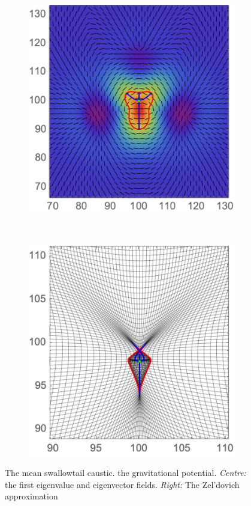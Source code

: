 \documentclass[a4paper, 11pt]{article}
\begin{document}
\begin{figure}
\begin{subfigure}[b]{0.32\textwidth}
\includegraphics[width=\textwidth]{Swallowtail_mean_L}
\end{subfigure}~
\begin{subfigure}[b]{0.32\textwidth}
\includegraphics[width=\textwidth]{Swallowtail_mean_Z}
\end{subfigure}
\caption{The mean swallowtail caustic.  the gravitational potential. \textit{Centre:} the first eigenvalue and eigenvector fields. \textit{Right:} The Zel'dovich approximation}\label{fig:meanSwallowtail}
\end{figure}
\end{document}
